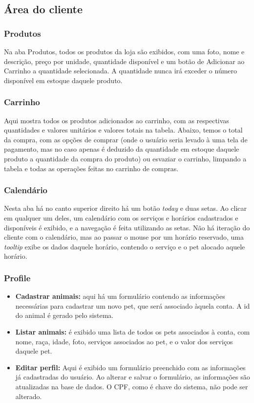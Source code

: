 \documentclass[10pt,a4paper]{article}
\begin{document}
\subsection{Área do cliente}
\subsubsection{Produtos}
Na aba Produtos, todos os produtos da loja são exibidos, com uma foto, nome e descrição, preço por unidade, quantidade disponível e um botão de Adicionar ao Carrinho a quantidade selecionada. A quantidade nunca irá exceder o número disponível em estoque daquele produto.
\subsubsection{Carrinho}
Aqui mostra todos os produtos adicionados ao carrinho, com as respectivas quantidades e valores unitários e valores totais na tabela. Abaixo, temos o total da compra, com as opções de comprar (onde o usuário seria levado à uma tela de pagamento, mas no caso apenas é deduzido da quantidade em estoque daquele produto a quantidade da compra do produto) ou esvaziar o carrinho, limpando a tabela e todas as operações feitas no carrinho de compras.
\subsubsection{Calendário}
Nesta aba há no canto superior direito há um botão \textit{today} e duas setas. Ao clicar em qualquer um deles, um calendário com os serviços e horários cadastrados e disponíveis é exibido, e a navegação é feita utilizando as setas. Não há iteração do cliente com o calendário, mas ao passar o mouse por um horário reservado, uma \textit{tooltip} exibe os dados daquele horário, contendo o serviço e o pet alocado aquele horário.
\subsubsection{Profile}
\begin{itemize}
\item \textbf{Cadastrar animais:} aqui há um formulário contendo as informações necessárias para cadastrar um novo pet, que será associado àquela conta. A id do animal é gerado pelo sistema.
\item \textbf{Listar animais:} é exibido uma lista de todos os pets associados à conta, com nome, raça, idade, foto, serviços associados ao pet, e o valor dos serviços daquele pet.
\item \textbf{Editar perfil:} Aqui é exibido um formulário preenchido com as informações já cadastradas do usuário. Ao alterar e salvar o formulário, as informações são atualizadas na base de dados. O CPF, como é chave do sistema, não pode ser alterado.
\end{itemize}
\end{document}
